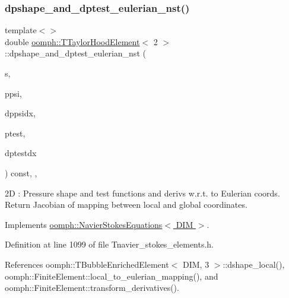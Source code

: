 \subsubsection{\texorpdfstring{dpshape\+\_\+and\+\_\+dptest\+\_\+eulerian\+\_\+nst()}{dpshape\_and\_dptest\_eulerian\_nst()}\hspace{0.1cm}{\footnotesize\ttfamily [2/3]}}
{\footnotesize\ttfamily template$<$$>$ \\
double \hyperlink{classoomph_1_1TTaylorHoodElement}{oomph\+::\+T\+Taylor\+Hood\+Element}$<$ 2 $>$\+::dpshape\+\_\+and\+\_\+dptest\+\_\+eulerian\+\_\+nst (\begin{DoxyParamCaption}\item[{const \hyperlink{classoomph_1_1Vector}{Vector}$<$ double $>$ \&}]{s,  }\item[{\hyperlink{classoomph_1_1Shape}{Shape} \&}]{ppsi,  }\item[{\hyperlink{classoomph_1_1DShape}{D\+Shape} \&}]{dppsidx,  }\item[{\hyperlink{classoomph_1_1Shape}{Shape} \&}]{ptest,  }\item[{\hyperlink{classoomph_1_1DShape}{D\+Shape} \&}]{dptestdx }\end{DoxyParamCaption}) const\hspace{0.3cm}{\ttfamily [inline]}, {\ttfamily [protected]}, {\ttfamily [virtual]}}

2D \+: Pressure shape and test functions and derivs w.\+r.\+t. to Eulerian coords. Return Jacobian of mapping between local and global coordinates. 

Implements \hyperlink{classoomph_1_1NavierStokesEquations_a2f3024a4d370ec45ddffacb236bc2bb2}{oomph\+::\+Navier\+Stokes\+Equations$<$ D\+I\+M $>$}.



Definition at line 1099 of file Tnavier\+\_\+stokes\+\_\+elements.\+h.



References oomph\+::\+T\+Bubble\+Enriched\+Element$<$ D\+I\+M, 3 $>$\+::dshape\+\_\+local(), oomph\+::\+Finite\+Element\+::local\+\_\+to\+\_\+eulerian\+\_\+mapping(), and oomph\+::\+Finite\+Element\+::transform\+\_\+derivatives().

\mbox{\label{classoomph_1_1TTaylorHoodElement_a1d9b249727edb35ae6f454a0eb3f779c}} 
